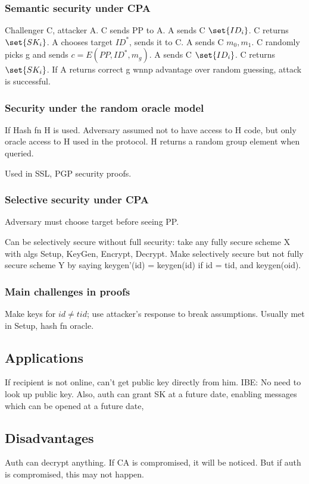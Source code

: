 \documentclass[oneside, article]{memoir}
\begin{document}
\subsubsection{Semantic security under CPA}
Challenger C, attacker A. C sends PP to A. A sends C $\set{ID_{i}}$. C returns $\set{SK_{i}}$. A chooses target $ID^{*}$, sends it to C. A sends C $m_{0}, m_{1}$. C randomly picks g and sends $c = E(PP, ID^{*}, m_g)$. A sends C $\set{ID_{i}}$. C returns $\set{SK_{i}}$. If A returns correct g wnnp advantage over random guessing, attack is successful.

\subsubsection{Security under the random oracle model}
If Hash fn H is used. Adversary assumed not to have access to H code, but only oracle access to H used in the protocol. H returns a random group element when queried.

Used in SSL, PGP security proofs.

\subsubsection{Selective security under CPA}
Adversary must choose target before seeing PP.

Can be selectively secure without full security: take any fully secure scheme X with algs Setup, KeyGen, Encrypt, Decrypt. Make selectively secure but not fully secure scheme Y by saying keygen'(id) = keygen(id) if id = tid, and keygen(oid).

\subsubsection{Main challenges in proofs}
Make keys for $id \neq tid$; use attacker's response to break assumptions. Usually met in Setup, hash fn oracle.

\subsection{Applications}
If recipient is not online, can't get public key directly from him. IBE: No need to look up public key. Also, auth can grant SK at a future date, enabling messages which can be opened at a future date,

\subsection{Disadvantages}
Auth can decrypt anything. If CA is compromised, it will be noticed. But if auth is compromised, this may not happen.
\end{document}
